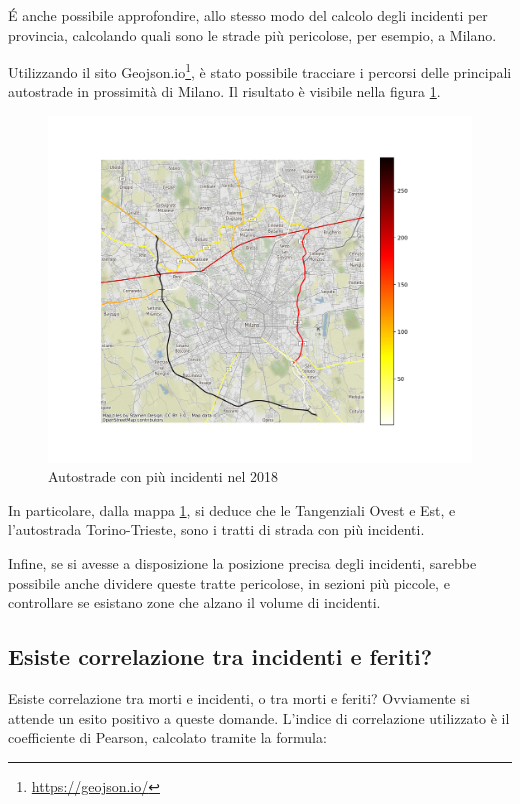 \documentclass[a4paper,12pt]{report}
\begin{document}
\'E anche possibile approfondire, allo stesso modo del calcolo degli incidenti per 
provincia, calcolando quali sono le strade più pericolose, per esempio, 
a Milano.

Utilizzando il sito Geojson.io\footnote{\url{https://geojson.io/}}, 
è stato possibile tracciare i percorsi delle principali autostrade in prossimità di 
Milano. Il risultato è visibile nella figura \ref{fig:line-incidenti-milano}.

\begin{figure}
    \includegraphics[width=\linewidth]{../src/incidenti/incidenti_aci/autostrade/incidenti_line_chart.png}
    \caption{Autostrade con più incidenti nel 2018}
    \label{fig:line-incidenti-milano}
\end{figure}

In particolare, dalla mappa \ref{fig:line-incidenti-milano}, si deduce che le 
Tangenziali Ovest e Est, e l'autostrada Torino-Trieste, sono i tratti di 
strada con più incidenti.

Infine, se si avesse a disposizione la posizione precisa degli incidenti, 
sarebbe possibile anche dividere queste tratte pericolose, in sezioni più piccole, 
e controllare se esistano zone che alzano il volume di incidenti.

\subsection{Esiste correlazione tra incidenti e feriti?}

Esiste correlazione tra morti e incidenti, o tra morti e feriti?
Ovviamente si attende un esito positivo a queste domande.
L'indice di correlazione utilizzato è il coefficiente di Pearson, calcolato tramite la 
formula: 
\end{document}
